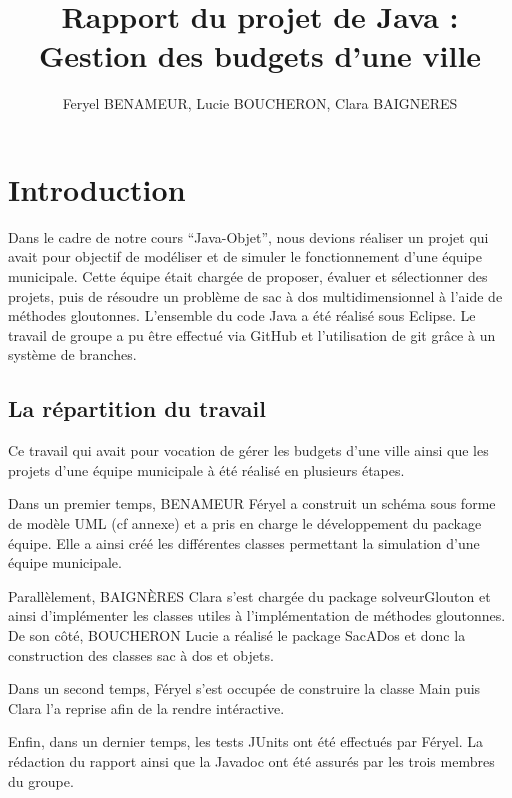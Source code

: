 \documentclass[11pt]{article}
\title{Rapport du projet de Java : Gestion des budgets d'une ville}
\date{}
\author{Feryel BENAMEUR, Lucie BOUCHERON, Clara BAIGNERES}
\begin{document}
\maketitle

\tableofcontents

\section{Introduction}


Dans le cadre de notre cours “Java-Objet”, nous devions réaliser un projet qui avait pour objectif de modéliser et de simuler le fonctionnement d’une équipe municipale. Cette équipe était chargée de proposer, évaluer et sélectionner des projets, puis de résoudre un problème de sac à dos multidimensionnel à l’aide de méthodes gloutonnes. L’ensemble du code Java a été réalisé sous Eclipse. Le travail de groupe a pu être effectué via GitHub et l’utilisation de git grâce à un système de branches.

\subsection{La répartition du travail}

Ce travail qui avait pour vocation de gérer les budgets d’une ville ainsi que les projets d’une équipe municipale à été réalisé en plusieurs étapes. 

Dans un premier temps, BENAMEUR Féryel a construit un schéma sous forme de modèle UML (cf annexe) et a pris en charge le développement du package équipe. Elle a ainsi créé les différentes classes permettant la simulation d’une équipe municipale.

Parallèlement, BAIGNÈRES Clara s’est chargée du package solveurGlouton et ainsi d’implémenter les classes utiles à l’implémentation de méthodes gloutonnes. De son côté, BOUCHERON Lucie a réalisé le package SacADos et donc la construction des classes sac à dos et objets.

Dans un second temps, Féryel s’est occupée de construire la classe Main puis Clara l’a reprise afin de la rendre intéractive.

Enfin, dans un dernier temps, les tests JUnits ont été effectués par Féryel. La rédaction du rapport ainsi que la Javadoc ont été assurés par les trois membres du groupe.
\end{document}
